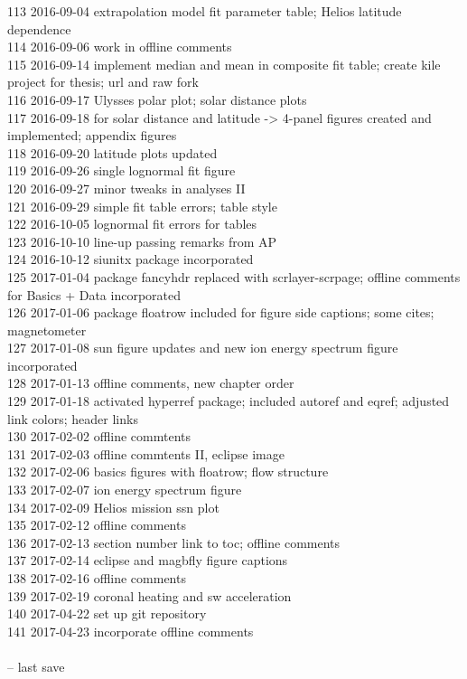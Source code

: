 \begin{footnotesize}
113	2016-09-04	extrapolation model fit parameter table; Helios latitude dependence\\
114	2016-09-06	work in offline comments\\
115	2016-09-14	implement median and mean in composite fit table; create kile project for thesis; url and raw fork\\
116	2016-09-17	Ulysses polar plot; solar distance plots\\
117	2016-09-18	for solar distance and latitude -> 4-panel figures created and implemented; appendix figures\\
118	2016-09-20	latitude plots updated\\
119	2016-09-26	single lognormal fit figure\\
120	2016-09-27	minor tweaks in analyses II\\
121	2016-09-29	simple fit table errors; table style\\
122	2016-10-05	lognormal fit errors for tables\\
123	2016-10-10	line-up passing remarks from AP\\
124	2016-10-12	siunitx package incorporated\\
125	2017-01-04	package fancyhdr replaced with scrlayer-scrpage; offline comments for Basics + Data incorporated\\
126	2017-01-06	package floatrow included for figure side captions; some cites; magnetometer\\
127	2017-01-08	sun figure updates and new ion energy spectrum figure incorporated\\
128	2017-01-13	offline comments, new chapter order\\
129	2017-01-18	activated hyperref package; included autoref and eqref; adjusted link colors; header links\\
130	2017-02-02	offline commtents\\
131	2017-02-03	offline commtents II, eclipse image\\
132	2017-02-06	basics figures with floatrow; flow structure\\
133	2017-02-07	ion energy spectrum figure\\
134	2017-02-09	Helios mission ssn plot\\
135	2017-02-12	offline comments\\
136	2017-02-13	section number link to toc; offline comments\\
137	2017-02-14	eclipse and magbfly figure captions\\
138	2017-02-16	offline comments\\
139	2017-02-19	coronal heating and sw acceleration\\
140	2017-04-22	set up git repository\\
141	2017-04-23	incorporate offline comments\\
\\
\ISOToday{} \thistime{} -- last save
\end{footnotesize}

